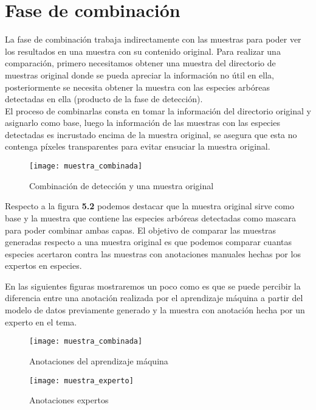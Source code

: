 \section{Fase de combinación}
La fase de combinación trabaja indirectamente con las muestras para poder ver los resultados en una muestra con su contenido original. Para realizar una comparación, primero necesitamos obtener una muestra del directorio de muestras original donde se pueda apreciar la información no útil en ella, posteriormente se necesita obtener la muestra con las especies arbóreas detectadas en ella (producto de la fase de detección).\\ 

El proceso de combinarlas consta en tomar la información del directorio original y asignarlo como base, luego la información de las muestras con las especies detectadas es incrustado encima de la muestra original, se asegura que esta no contenga píxeles transparentes para evitar ensuciar la muestra original.

\begin{figure}[H]
  \centering
  \begin{minipage}[b]{0.8\textwidth}
        \texttt{[image: muestra\_combinada]}
    \caption{Combinación de detección y una muestra original}
  \end{minipage}
\end{figure}

Respecto a la figura \textbf{5.2} podemos destacar que la muestra original sirve como base y la muestra que contiene las especies arbóreas detectadas como mascara para poder combinar ambas capas. El objetivo de comparar las muestras generadas respecto a una muestra original es que podemos comparar cuantas especies acertaron contra las muestras con anotaciones manuales hechas por los expertos en especies.

\break


En las siguientes figuras mostraremos un poco como es que se puede percibir la diferencia entre una anotación realizada por el aprendizaje máquina a partir del modelo de datos previamente generado y la muestra con anotación hecha por un experto en el tema. \\

\begin{figure}[H]
  \centering
  \begin{minipage}[b]{0.4\textwidth}
    \texttt{[image: muestra\_combinada]}
    \caption{Anotaciones del aprendizaje máquina}
  \end{minipage}
  \hfill
  \begin{minipage}[b]{0.4\textwidth}
    \texttt{[image: muestra\_experto]}
    \caption{Anotaciones expertos}
  \end{minipage}
\end{figure}

